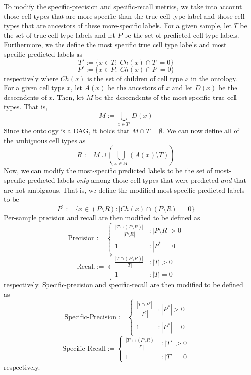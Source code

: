 To modify the specific-precision and specific-recall metrics, we take into account those cell types that are more specific than the true cell type label and those cell types that are ancestors of these more-specific labels. For a given sample, let $T$ be the set of true cell type labels and let $P$ be the set of predicted cell type labels. Furthermore, we the define the most specific true cell type labels and most specific predicted labels as 
$$T' := \{x \in T : |Ch(x) \cap T| = 0 \}$$
$$P' := \{x \in P : |Ch(x) \cap P| = 0 \}$$
respectively where $Ch(x)$ is the set of children of cell type $x$ in the ontology.  For a given cell type $x$, let $A(x)$ be the ancestors of $x$ and let $D(x)$ be the descendents of $x$. Then, let $M$ be the descendents of the most specific true cell types. That is,
$$M := \bigcup_{x \in T'} D(x)$$
Since the ontology is a DAG, it holds that $M \cap T = \emptyset$.
We can now define all of the ambiguous cell types as
$$R := M \cup \left(\bigcup_{x \in M} (A(x) \setminus T)\right)$$
Now, we can modify the most-specific predicted labels to be the set of most-specific predicted labels \textit{only} among those cell types that were predicted \textit{and} that are not ambiguous. That is, we define the modified most-specific predicted labels to be
$$P^* := \{x \in (P \setminus R) : |Ch(x) \cap (P \setminus R)| = 0 \}$$
Per-sample precision and recall are then modified to be defined as
$$\text{Precision} := \left\{
     \begin{array}{lr}
       \frac{|T \cap (P \setminus R)|}{|P \setminus R|} & : |P \setminus R| > 0  \\
       1 & : |P^*| = 0
     \end{array}
     \right.$$
$$\text{Recall} := \left\{
     \begin{array}{lr}
       \frac{|T \cap (P \setminus R)|}{|T|} & : |T| > 0  \\
       1 & : |T| = 0
     \end{array}
     \right.$$
respectively.  Specific-precision and specific-recall are then modified to be defined as
$$\text{Specific-Precision} := \left\{
     \begin{array}{lr}
       \frac{|T \cap P^*|}{|P^*|} & : |P^*| > 0  \\
       1 & : |P^*| = 0
     \end{array}
     \right.$$
$$\text{Specific-Recall} := \left\{
     \begin{array}{lr}
       \frac{|T' \cap (P \setminus R)|}{|T'|} & : |T'| > 0  \\
       1 & : |T'| = 0
     \end{array}
     \right.$$
respectively. 




